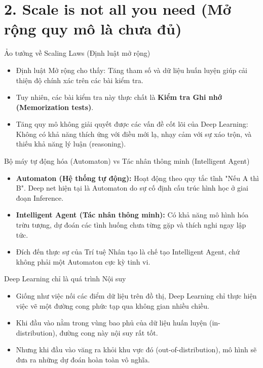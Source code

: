 \documentclass[aspectratio=169]{beamer}
\begin{document}
\section{2. Scale is not all you need (Mở rộng quy mô là chưa đủ)}

\begin{frame}{Ảo tưởng về Scaling Laws (Định luật mở rộng)}
    \begin{itemize}
        \item Định luật Mở rộng cho thấy: Tăng tham số và dữ liệu huấn luyện giúp cải thiện độ chính xác trên các bài kiểm tra.
        \item Tuy nhiên, các bài kiểm tra này thực chất là \textbf{Kiểm tra Ghi nhớ (Memorization tests)}.
        \item Tăng quy mô không giải quyết được các vấn đề cốt lõi của Deep Learning: Không có khả năng thích ứng với điều mới lạ, nhạy cảm với sự xáo trộn, và thiếu khả năng lý luận (reasoning).
    \end{itemize}
\end{frame}

\begin{frame}{Bộ máy tự động hóa (Automaton) vs Tác nhân thông minh (Intelligent Agent)}
    \begin{itemize}
        \item \textbf{Automaton (Hệ thống tự động):} Hoạt động theo quy tắc tĩnh "Nếu A thì B". Deep net hiện tại là Automaton do sự cố định cấu trúc hình học ở giai đoạn Inference.
        \item \textbf{Intelligent Agent (Tác nhân thông minh):} Có khả năng mô hình hóa trừu tượng, dự đoán các tình huống chưa từng gặp và thích nghi ngay lập tức.
        \item Đích đến thực sự của Trí tuệ Nhân tạo là chế tạo Intelligent Agent, chứ không phải một Automaton cực kỳ tinh vi.
    \end{itemize}
\end{frame}

\begin{frame}{Deep Learning chỉ là quá trình Nội suy}
    \begin{itemize}
        \item Giống như việc nối các điểm dữ liệu trên đồ thị, Deep Learning chỉ thực hiện việc vẽ một đường cong phức tạp qua không gian nhiều chiều.
        \item Khi đầu vào nằm trong vùng bao phủ của dữ liệu huấn luyện (in-distribution), đường cong này nội suy rất tốt.
        \item Nhưng khi đầu vào văng ra khỏi khu vực đó (out-of-distribution), mô hình sẽ đưa ra những dự đoán hoàn toàn vô nghĩa.
    \end{itemize}
\end{frame}
\end{document}
